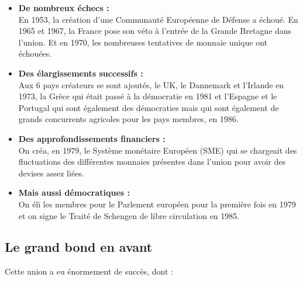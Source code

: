 \begin{itemize}
	\item \textbf{De nombreux échecs :} \\
	En 1953, la création d'une Communauté Européenne de Défense a échoué. En 1965 et 1967, la France pose son véto à l'entrée de la Grande Bretagne dans l'union. Et en 1970, les nombreuses tentatives de monnaie unique ont échouées.
	
	\item \textbf{Des élargissements successifs :} \\
	Aux 6 pays créateurs se sont ajoutés, le UK, le Dannemark et l'Irlande en 1973, la Grèce qui était passé à la démocratie en 1981 et l'Espagne et le Portugal qui sont également des démocraties mais qui sont également de grands concurrents agricoles pour les pays membres, en 1986.
	
	\item \textbf{Des approfondissements financiers :} \\
	On créa, en 1979, le Système monétaire Européen (SME) qui se chargeait des fluctuations des différentes monnaies présentes dans l'union pour avoir des devises assez liées. 
	
	\item \textbf{Mais aussi démocratiques :} \\
	On éli les membres pour le Parlement européen pour la première fois en 1979 et on signe le Traité de Schengen de libre circulation en 1985.
\end{itemize}

\subsection{Le grand bond en avant}
Cette union a eu énormement de succès, dont :

